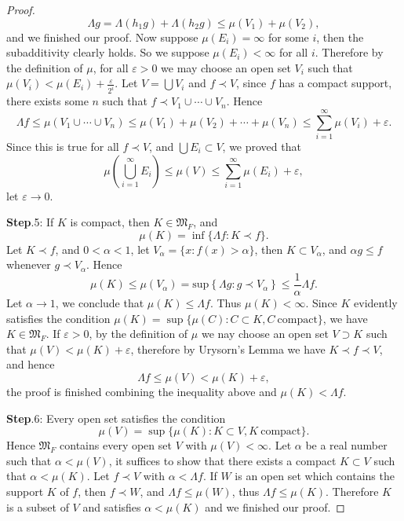 \begin{proof}
$$
\Lambda g=\Lambda \left( h_1g \right) +\Lambda \left( h_2g \right) \le \mu \left( V_1 \right) +\mu \left( V_2 \right) ,
$$
and we finished our proof. Now suppose $\mu(E_i)=\infty$ for some $i$, then the subadditivity clearly holds. So we suppose $\mu(E_i)<\infty$ for all $i$. Therefore by the definition of $\mu$, for all $\varepsilon>0$ we may choose an open set $V_i$ such that $\mu(V_i)<\mu(E_i)+\frac{\varepsilon}{2^i}$. Let $V=\bigcup V_i$ and $f\prec V$, since $f$ has a compact support, there exists some $n$ such that $f\prec V_1\cup\cdots\cup V_n$. Hence 
$$
\Lambda f\le \mu \left( V_1\cup \cdots \cup V_n \right) \le \mu \left( V_1 \right) +\mu \left( V_2 \right) +\cdots +\mu \left( V_n \right) \le \sum_{i=1}^{\infty}{\mu \left( V_i \right)}+\varepsilon .
$$
Since this is true for all $f\prec V$, and $\bigcup{E_i}\subset V$, we proved that 
$$
\mu \left( \bigcup_{i=1}^{\infty}{E_i} \right) \le \mu \left( V \right) \le \sum_{i=1}^{\infty}{\mu \left( E_i \right)}+\varepsilon ,
$$
let $\varepsilon\to 0$.\par
\textbf{Step}.5: If $K$ is compact, then $K\in\mathfrak{M}_F$, and 
$$\mu(K)=\inf\{\Lambda f:K\prec f\}.$$
Let $K\prec f$, and $0<\alpha<1$, let $V_\alpha=\{x:f(x)>\alpha\}$, then $K\subset V_\alpha$, and $\alpha g\le f$ whenever $g\prec V_\alpha$. Hence 
$$
\mu \left( K \right) \le \mu \left( V_{\alpha} \right) =\mathrm{sup}\left\{ \Lambda g:g\prec V_{\alpha} \right\} \le \frac{1}{\alpha}\Lambda f.
$$
Let $\alpha\to 1$, we conclude that $\mu(K)\le\Lambda f$. Thus $\mu(K)<\infty$. Since $K$ evidently satisfies the condition $\mu(K)=\sup\{\mu(C):C\subset K,C\ \text{compact}\}$, we have $K\in\mathfrak{M}_F$. If $\varepsilon>0$, by the definition of $\mu$ we nay choose an open set $V\supset K$ such that $\mu(V)<\mu(K)+\varepsilon$, therefore by Urysorn's Lemma we have $K\prec f\prec V$, and hence 
$$
\Lambda f\le \mu \left( V \right) <\mu \left( K \right) +\varepsilon ,
$$
the proof is finished combining the inequality above and $\mu(K)<\Lambda f$.\par
\textbf{Step}.6: Every open set satisfies the condition 
$$\mu(V)=\sup\{\mu(K):K\subset V,K\ \text{compact}\}.$$
Hence $\mathfrak{M}_F$ contains every open set $V$ with $\mu(V)<\infty$. Let $\alpha$ be a real number such that $\alpha<\mu(V)$, it suffices to show that there exists a compact $K\subset V$ such that $\alpha<\mu(K)$. Let $f\prec V$ with $\alpha<\Lambda f$. If $W$ is an open set which contains the support $K$ of $f$, then $f\prec W$, and $\Lambda f\le\mu(W)$, thus $\Lambda f\le\mu(K)$. Therefore $K$ is a subset of $V$ and satisfies $\alpha<\mu(K)$ and we finished our proof.\par

\end{proof}
